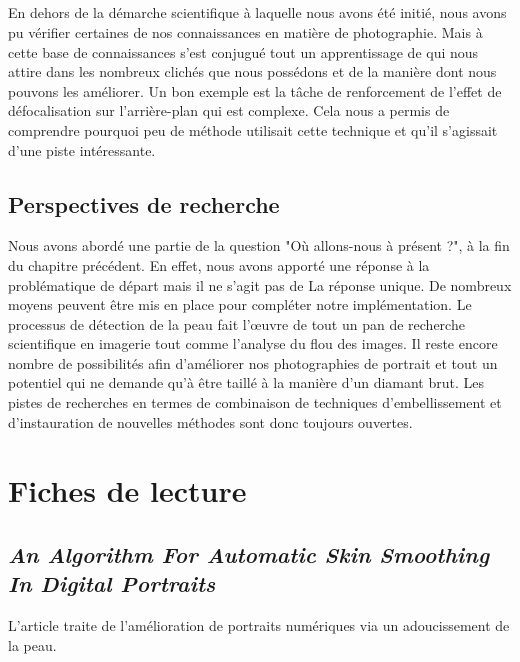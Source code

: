 \documentclass[11pt, french,screen]{report-rd-info}
\begin{document}
\paragraph*{}
En dehors de la démarche scientifique à laquelle nous avons été initié, nous avons pu vérifier certaines de nos connaissances en matière de photographie. Mais à cette base de connaissances s'est conjugué tout un apprentissage de qui nous attire dans les nombreux clichés que nous possédons et de la manière dont nous pouvons les améliorer. Un bon exemple est la tâche de renforcement de l'effet de défocalisation sur l'arrière-plan qui est complexe. Cela nous a permis de comprendre pourquoi peu de méthode utilisait cette technique et qu'il s'agissait d'une piste intéressante.


\section{Perspectives de recherche}
Nous avons abordé une partie de la question "Où allons-nous à présent ?", à la fin du chapitre précédent. En effet, nous avons apporté une réponse à la problématique de départ mais il ne s'agit pas de La réponse unique. De nombreux moyens peuvent être mis en place pour compléter notre implémentation. Le processus de détection de la peau fait l'œuvre de tout un pan de recherche scientifique en imagerie tout comme l'analyse du flou des images. Il reste encore nombre de possibilités afin d'améliorer nos photographies de portrait et tout un potentiel qui ne demande qu'à être taillé à la manière d'un diamant brut. Les pistes de recherches en termes de combinaison de techniques d'embellissement et d'instauration de nouvelles méthodes sont donc toujours ouvertes.





\listoffigures{}
\listoftables{}
\appendix
\chapter{Fiches de lecture}
\label{ann:FichesLecture}
\section{\emph{An Algorithm For Automatic Skin Smoothing In Digital Portraits}}
L'article \cite{Lee} traite de l'amélioration de portraits numériques via un adoucissement de la peau.
\end{document}
